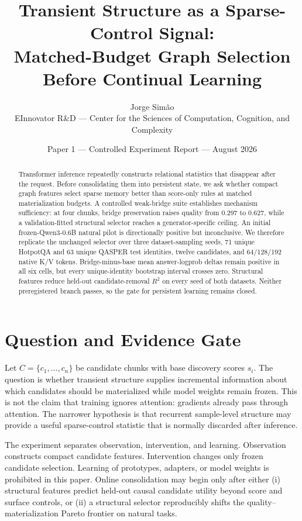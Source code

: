 \documentclass[10pt]{article}
\title{Transient Structure as a Sparse-Control Signal:\\Matched-Budget Graph Selection Before Continual Learning}
\author{Jorge Sim\~ao\\EInnovator R\&D --- Center for the Sciences of Computation, Cognition, and Complexity}
\date{Paper 1 --- Controlled Experiment Report --- August 2026}
\begin{document}
\maketitle

\begin{abstract}
Transformer inference repeatedly constructs relational statistics that disappear after the request. Before consolidating them into persistent state, we ask whether compact graph features select sparse memory better than score-only rules at matched materialization budgets. A controlled weak-bridge suite establishes mechanism sufficiency: at four chunks, bridge preservation raises quality from 0.297 to 0.627, while a validation-fitted structural selector reaches a generator-specific ceiling. An initial frozen-Qwen3-0.6B natural pilot is directionally positive but inconclusive. We therefore replicate the unchanged selector over three dataset-sampling seeds, 71 unique HotpotQA and 63 unique QASPER test identities, twelve candidates, and 64/128/192 native K/V tokens. Bridge-minus-base mean answer-logprob deltas remain positive in all six cells, but every unique-identity bootstrap interval crosses zero. Structural features reduce held-out candidate-removal $R^2$ on every seed of both datasets. Neither preregistered branch passes, so the gate for persistent learning remains closed.
\end{abstract}

\section{Question and Evidence Gate}

Let $C=\{c_1,\ldots,c_n\}$ be candidate chunks with base discovery scores $s_i$. The question is whether transient structure supplies incremental information about which candidates should be materialized while model weights remain frozen. This is not the claim that training ignores attention: gradients already pass through attention. The narrower hypothesis is that recurrent sample-level structure may provide a useful sparse-control statistic that is normally discarded after inference.

The experiment separates observation, intervention, and learning. Observation constructs compact candidate features. Intervention changes only frozen candidate selection. Learning of prototypes, adapters, or model weights is prohibited in this paper. Online consolidation may begin only after either (i) structural features predict held-out causal candidate utility beyond score and surface controls, or (ii) a structural selector reproducibly shifts the quality--materialization Pareto frontier on natural tasks.
\end{document}
